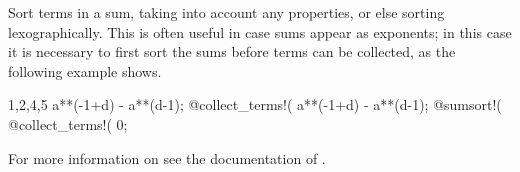 
Sort terms in a sum, taking into account any 
properties, or else sorting lexographically. \label{loc_sumsort}
This is often useful in case sums appear as exponents; in this case it
is necessary to first sort the sums before terms can be collected, as
the following example shows.
\begin{screen}{1,2,4,5}
a**(-1+d) - a**(d-1);
@collect_terms!(%
a**(-1+d) - a**(d-1);
@sumsort!(%
@collect_terms!(%
0;
\end{screen}
For more information on  see the documentation
of .


